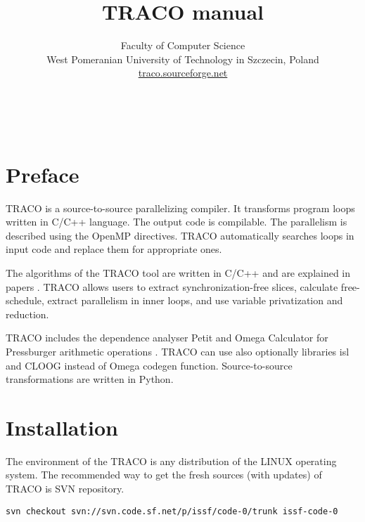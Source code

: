 \documentclass[a4paper,12pt]{book}
\author{Faculty of Computer Science \\  West Pomeranian University of Technology in Szczecin, Poland \\\url{traco.sourceforge.net}}
\title{TRACO manual}
\begin{document}
\maketitle           %

‎


\section{Preface}

TRACO is a source-to-source parallelizing compiler. It transforms program loops written in C/C++ language. The output code is compilable. The parallelism is described using the OpenMP directives. TRACO automatically searches loops in input code and replace them for appropriate ones. 

The algorithms of the TRACO tool are written in C/C++ and are explained in papers \cite{parco,parco2}. TRACO allows users to extract synchronization-free slices, calculate free-schedule, extract parallelism in inner loops, and use variable privatization and reduction.

TRACO includes the dependence analyser Petit \cite{petit} and Omega Calculator for Pressburger arithmetic operations \cite{kelly}. TRACO can use also optionally libraries isl and CLOOG \cite{cloog} instead of Omega codegen function. Source-to-source transformations are written in Python. 

\section{Installation}

The environment of the TRACO is any distribution of the LINUX operating system. The recommended way to get the fresh sources (with updates) of TRACO is SVN repository. 

\small
\begin{verbatim}
svn checkout svn://svn.code.sf.net/p/issf/code-0/trunk issf-code-0
\end{verbatim}
\normalsize
\end{document}
